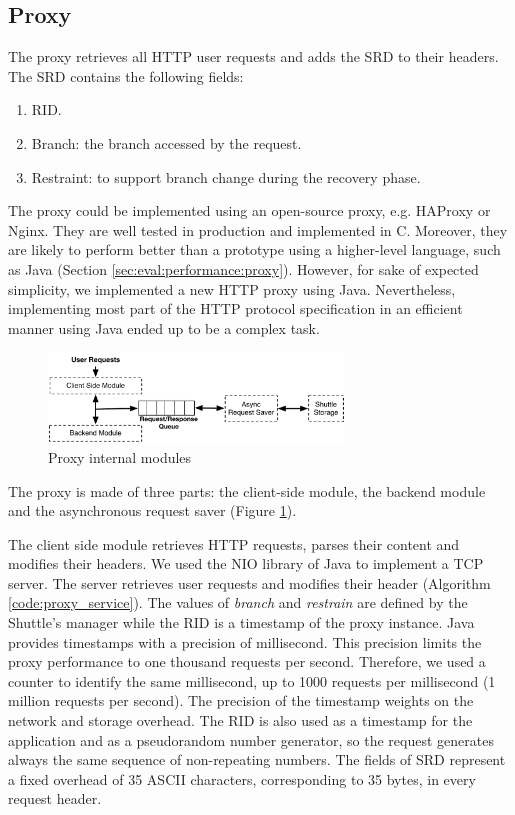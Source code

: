 \subsection{Proxy}\label{sec:impl:normal:proxy}
The proxy retrieves all \ac{HTTP} user requests and adds the \acf{SRD} to their headers. The \ac{SRD} contains the following fields:
\begin{enumerate}
	\item \acf{RID}.
	\item Branch: the branch accessed by the request.
	\item Restraint: to support branch change during the recovery phase.
\end{enumerate}

The proxy could be implemented using an open-source proxy, e.g. HAProxy or Nginx. They are well tested in production and implemented in C. Moreover, they are likely to perform better than a prototype using a higher-level language, such as Java (Section \ref{sec:eval:performance:proxy}). However, for sake of expected simplicity, we implemented a new \ac{HTTP} proxy using Java. Nevertheless, implementing most part of the \ac{HTTP} protocol specification in an efficient manner using Java ended up to be a complex task.


\begin{figure}
  \centering
  \includegraphics[width=0.7\textwidth]{arch/proxy}
  \caption{Proxy internal modules}
  \label{fig:impl:proxy_modules}
\end{figure}

The proxy is made of three parts: the client-side module, the backend module and the asynchronous request saver (Figure \ref{fig:impl:proxy_modules}).

The client side module retrieves \ac{HTTP} requests, parses their content and modifies their headers. We used the \acf{NIO} library of Java to implement a TCP server. The server retrieves user requests and modifies their header (Algorithm \ref{code:proxy_service}). The values of \emph{branch} and \emph{restrain} are defined by the Shuttle's manager while the \acf{RID} is a timestamp of the proxy instance. Java provides timestamps with a precision of millisecond. This precision limits the proxy performance to one thousand requests per second. Therefore, we used a counter to identify the same millisecond, up to 1000 requests per millisecond (1 million requests per second). The precision of the timestamp weights on the network and storage overhead. The \ac{RID} is also used as a timestamp for the application and as a pseudorandom number generator, so the request generates always the same sequence of non-repeating numbers. The fields of \acf{SRD} represent a fixed overhead of 35 ASCII characters, corresponding to 35 bytes, in every request header.

